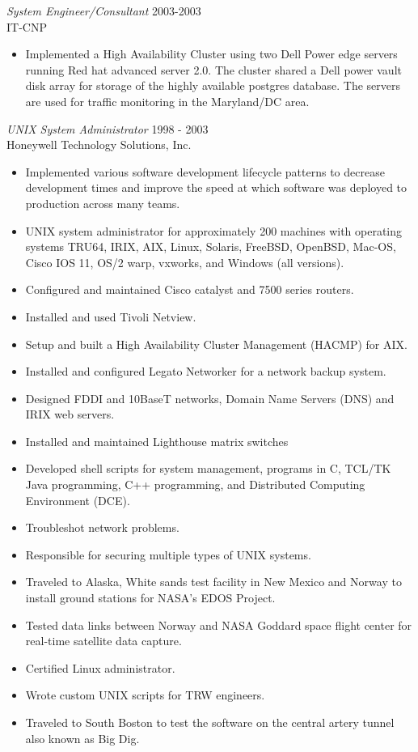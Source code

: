 \documentclass[margin, 10pt]{res} %
\begin{document}
\begin{resume}
{\sl System Engineer/Consultant } \hfill 2003-2003 \\
IT-CNP
\begin{itemize}
  \item Implemented a High Availability Cluster using two Dell Power edge servers running Red hat advanced server 2.0.  The cluster shared a Dell power vault disk array for storage of the highly available postgres database. The servers are used for traffic monitoring in the Maryland/DC area.
\end{itemize}

{\sl UNIX System Administrator } \hfill 1998 - 2003 \\
Honeywell Technology Solutions, Inc.
\begin{itemize}
  \item Implemented various software development lifecycle patterns to decrease development times and improve the speed at which software was deployed to production across many teams.
  \item UNIX system administrator for approximately 200 machines with operating systems TRU64, IRIX, AIX, Linux, Solaris, FreeBSD, OpenBSD, Mac-OS, Cisco IOS 11, OS/2 warp, vxworks, and Windows (all versions).
  \item Configured and maintained Cisco catalyst and 7500 series routers.
  \item Installed and used Tivoli Netview.
  \item Setup and built a High Availability Cluster Management (HACMP) for AIX.
  \item Installed and configured Legato Networker for a network backup system.
  \item Designed FDDI and 10BaseT networks, Domain Name Servers (DNS) and IRIX web servers.
  \item Installed and maintained Lighthouse matrix switches
  \item Developed shell scripts for system management, programs in C, TCL/TK Java programming, C++ programming, and Distributed Computing Environment (DCE).
  \item Troubleshot network problems.
  \item Responsible for securing multiple types of UNIX systems.
  \item Traveled to Alaska, White sands test facility in New Mexico and Norway to install ground stations for NASA's EDOS Project.
  \item Tested data links between Norway and NASA Goddard space flight center for real-time satellite data capture.
  \item Certified Linux administrator.
  \item Wrote custom UNIX scripts for TRW engineers.
  \item Traveled to South Boston to test the software on the central artery tunnel also known as Big Dig.
\end{itemize}


\end{resume}
\end{document}

